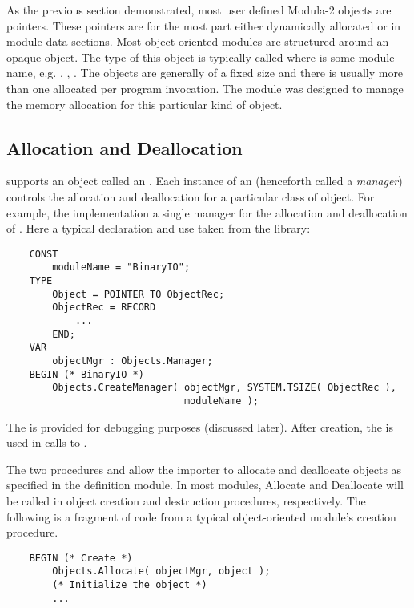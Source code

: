 As the previous section demonstrated, most user defined Modula-2 objects
are pointers.  These pointers are for the most part either
dynamically allocated or in module data sections.   Most object-oriented
modules are structured around an opaque object.  The type of this
object is typically called  where  is
some module name, e.g. , ,
.  The objects are generally of a fixed size and
there is usually more than one allocated per program invocation.
The module  was designed to manage the memory
allocation for this particular kind of object.

\subsection{Allocation and Deallocation}
 supports an object called an .
Each instance of an  (henceforth called a 
{\em manager}) controls the allocation and deallocation for a 
particular class of object.  For example, the implementation
a single manager for the allocation and deallocation of
.  Here a typical declaration and
use taken from the library:

\begin{verbatim}
    CONST
        moduleName = "BinaryIO";
    TYPE
        Object = POINTER TO ObjectRec;
        ObjectRec = RECORD
            ...
        END;
    VAR
        objectMgr : Objects.Manager;
    BEGIN (* BinaryIO *)
        Objects.CreateManager( objectMgr, SYSTEM.TSIZE( ObjectRec ),
                               moduleName );
\end{verbatim}

The  is provided for debugging purposes (discussed later).
After creation, the  is used in calls to .

The two procedures  and  allow the
importer to allocate and deallocate objects as specified in the
definition module.  In most modules, Allocate and Deallocate will
be called in object creation and destruction procedures, respectively.
The following is a fragment of code from a typical object-oriented module's
creation procedure.

\begin{verbatim}
    BEGIN (* Create *)
        Objects.Allocate( objectMgr, object );
        (* Initialize the object *)
        ...
\end{verbatim}


